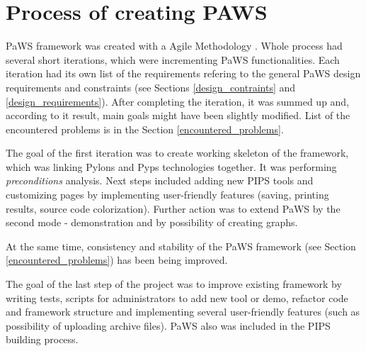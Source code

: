 \section{Process of creating PAWS}

PaWS framework was created with a Agile Methodology \cite{agilemethodology}. Whole process had several short iterations, which were incrementing PaWS functionalities. Each iteration had its own list of the requirements refering to the general PaWS design requirements and constraints (see Sections \ref{design_contraints} and \ref{design_requirements}). After completing the iteration, it was summed up and, according to it result, main goals might have been slightly modified. List of the encountered problems is in the Section \ref{encountered_problems}.

The goal of the first iteration was to create working skeleton of the framework, which was linking Pylons and Pyps technologies together. It was performing \emph{preconditions} analysis. Next steps included adding new PIPS tools and customizing pages by implementing user-friendly features (saving, printing results, source code colorization). Further action was to extend PaWS by the second mode - demonstration and by possibility of creating graphs. 

At the same time, consistency and stability of the PaWS framework (see Section \ref{encountered_problems}) has been being improved.

The goal of the last step of the project was to improve existing framework by writing tests, scripts for administrators to add new tool or demo, refactor code and framework structure and implementing several user-friendly features (such as possibility of uploading archive files). PaWS also was included in the PIPS building process.




